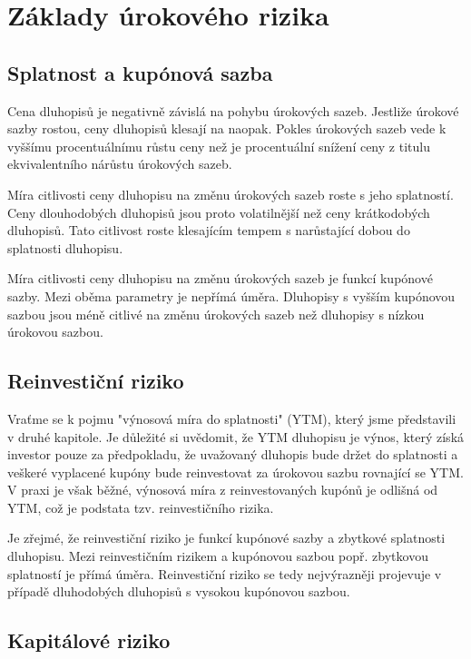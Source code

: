 \documentclass[a4paper]{book}
\begin{document}
\section{Základy úrokového rizika}

\subsection{Splatnost a kupónová sazba}

Cena dluhopisů je negativně závislá na pohybu úrokových sazeb. Jestliže úrokové sazby rostou, ceny dluhopisů klesají na naopak. Pokles úrokových sazeb vede k vyššímu procentuálnímu růstu ceny než je procentuální snížení ceny z titulu ekvivalentního nárůstu úrokových sazeb.

Míra citlivosti ceny dluhopisu na změnu úrokových sazeb roste s jeho splatností. Ceny dlouhodobých dluhopisů jsou proto volatilnější než ceny krátkodobých dluhopisů. Tato citlivost roste klesajícím tempem s narůstající dobou do splatnosti dluhopisu.

Míra citlivosti ceny dluhopisu na změnu úrokových sazeb je funkcí kupónové sazby. Mezi oběma parametry je nepřímá úměra. Dluhopisy s vyšším kupónovou sazbou jsou méně citlivé na změnu úrokových sazeb než dluhopisy s nízkou úrokovou sazbou.

\subsection{Reinvestiční riziko}

Vraťme se k pojmu "výnosová míra do splatnosti" (YTM), který jsme představili v druhé kapitole. Je důležité si uvědomit, že YTM dluhopisu je výnos, který získá investor pouze za předpokladu, že uvažovaný dluhopis bude držet do splatnosti a veškeré vyplacené kupóny bude reinvestovat za úrokovou sazbu rovnající se YTM. V praxi je však běžné, výnosová míra z reinvestovaných kupónů je odlišná od YTM, což je podstata tzv. reinvestičního rizika.

Je zřejmé, že reinvestiční riziko je funkcí kupónové sazby a zbytkové splatnosti dluhopisu. Mezi reinvestičním rizikem a kupónovou sazbou popř. zbytkovou splatností je přímá úměra. Reinvestiční riziko se tedy nejvýrazněji projevuje v případě dluhodobých dluhopisů s vysokou kupónovou sazbou.

\subsection{Kapitálové riziko}
\end{document}
